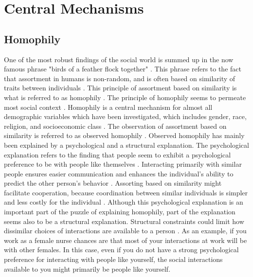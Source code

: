 \documentclass{article}
\begin{document}
\section{Central Mechanisms}
\subsection{Homophily}
One of the most robust findings of the social world is summed up in the now famous phrase "birds of a feather flock together" \cite{mcpherson_birds_2001}. This phrase refers to the fact that assortment in humans is non-random, and is often based on similarity of traits between individuals \cite{asikainen_cumulative_2020,crandall_feedback_2008,mcpherson_birds_2001}. This principle of assortment based on similarity is what is referred to as homophily \cite{mcpherson_birds_2001,kossinets_origins_2009}. The principle of homophily seems to permeate most social context \cite{taylor_exploring_2018}. 
Homophily is a central mechanism for almost all demographic variables which have been investigated, which includes gender, race, religion, and socioeconomic class \cite{asikainen_cumulative_2020,mcpherson_birds_2001}. The observation of assortment based on similarity is referred to as observed homophily \cite{peixoto_disentangling_2022}.  
Observed homophily has mainly been explained by a psychological and a structural explanation. The psychological explanation refers to the finding that people seem to exhibit a psychological preference to be with people like themselves \cite{asikainen_cumulative_2020,mcpherson_birds_2001,winter_you_2020}.
Interacting primarily with similar people ensures easier communication and enhances the individual’s ability to predict the other person’s behavior \cite{kossinets_origins_2009,winter_you_2020}. Assorting based on similarity might facilitate cooperation, because coordination between similar individuals is simpler and less costly for the individual \cite{winter_you_2020,carter2015phenotypic}. 
Although this psychological explanation is an important part of the puzzle of explaining homophily, part of the explanation seems also to be a structural explanation. Structural constraints could limit how dissimilar choices of interactions are available to a person \cite{peixoto_disentangling_2022}. As an example, if you work as a female nurse chances are that most of your interactions at work will be with other females. 
In this case, even if you do not have a strong psychological preference for interacting with people like yourself, the social interactions available to you might primarily be people like yourself. 
\end{document}
